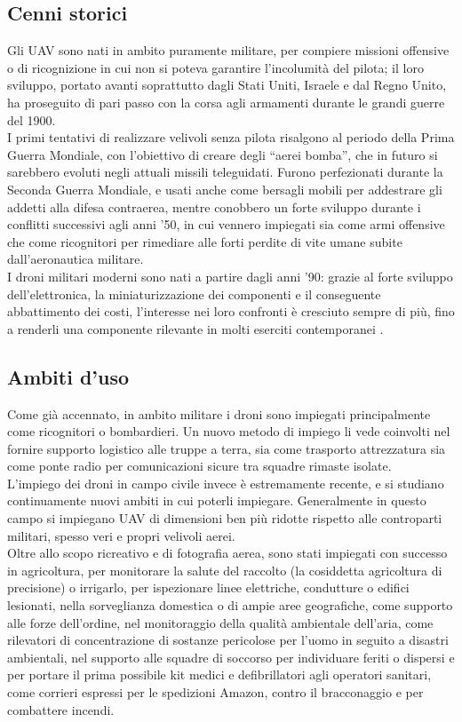 \subsection[Cenni storici]{Cenni storici}
Gli UAV sono nati in ambito puramente militare, per compiere missioni offensive o di ricognizione in cui non si poteva garantire l'incolumità del pilota; il loro sviluppo, portato avanti soprattutto dagli Stati Uniti, Israele e dal Regno Unito, ha proseguito di pari passo con la corsa agli armamenti durante le grandi guerre del 1900. \\
I primi tentativi di realizzare velivoli senza pilota risalgono al periodo della Prima Guerra Mondiale, con l'obiettivo di creare degli “aerei bomba”, che in futuro si sarebbero evoluti negli attuali missili teleguidati. 
Furono perfezionati durante la Seconda Guerra Mondiale, e usati anche come bersagli mobili per addestrare gli addetti alla difesa contraerea, mentre conobbero un forte sviluppo durante i conflitti successivi agli anni '50, in cui vennero impiegati sia come armi offensive che come ricognitori per rimediare alle forti perdite di vite umane subite dall'aeronautica militare.  \\
I droni militari moderni sono nati a partire dagli anni '90: grazie al forte sviluppo dell'elettronica, la miniaturizzazione dei componenti e il conseguente abbattimento dei costi, l'interesse nei loro confronti è cresciuto sempre di più, fino a renderli una componente rilevante in molti eserciti contemporanei \cite{keane2013brief}.

\subsection[Ambiti d'uso]{Ambiti d'uso}
Come già accennato, in ambito militare i droni sono impiegati principalmente come ricognitori o bombardieri. 
Un nuovo metodo di impiego li vede coinvolti nel fornire supporto logistico alle truppe a terra, sia come trasporto attrezzatura sia come ponte radio per comunicazioni sicure tra squadre rimaste isolate. \\
L'impiego dei droni in campo civile invece è estremamente recente, e si studiano continuamente nuovi ambiti in cui poterli impiegare. 
Generalmente in questo campo si impiegano UAV di dimensioni ben più ridotte rispetto alle controparti militari, spesso veri e propri velivoli aerei. \\
Oltre allo scopo ricreativo e di fotografia aerea, sono stati impiegati con successo in agricoltura, per monitorare la salute del raccolto (la cosiddetta agricoltura di precisione) o irrigarlo, per ispezionare linee elettriche, condutture o edifici lesionati, nella sorveglianza domestica o di ampie aree geografiche, come supporto alle forze dell'ordine, nel monitoraggio della qualità ambientale dell'aria, come rilevatori di concentrazione di sostanze pericolose per l'uomo in seguito a disastri ambientali, nel supporto alle squadre di soccorso per individuare feriti o dispersi e per portare il prima possibile kit medici e defibrillatori agli operatori sanitari, come corrieri espressi per le spedizioni Amazon, contro il bracconaggio e per combattere incendi. \cite{dronespeak} 

